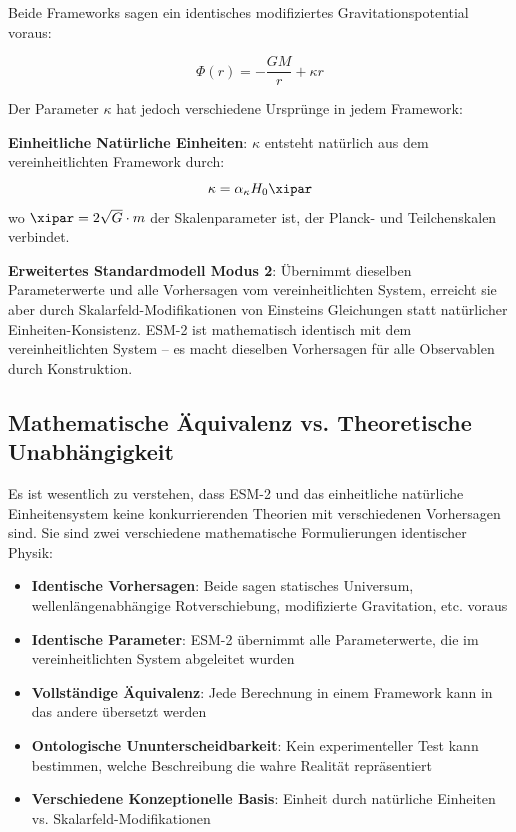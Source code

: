 	Beide Frameworks sagen ein identisches modifiziertes Gravitationspotential voraus:
	
	\begin{equation}
		\Phi(r) = -\frac{GM}{r} + \kappa r
	\end{equation}
	
	Der Parameter $\kappa$ hat jedoch verschiedene Ursprünge in jedem Framework:
	
	\textbf{Einheitliche Natürliche Einheiten}: $\kappa$ entsteht natürlich aus dem vereinheitlichten Framework durch:
	\begin{equation}
		\kappa = \alpha_\kappa H_0 \xipar
	\end{equation}
	wo $\xipar = 2\sqrt{G} \cdot m$ der Skalenparameter ist, der Planck- und Teilchenskalen verbindet.
	
	\textbf{Erweitertes Standardmodell Modus 2}: Übernimmt dieselben Parameterwerte und alle Vorhersagen vom vereinheitlichten System, erreicht sie aber durch Skalarfeld-Modifikationen von Einsteins Gleichungen statt natürlicher Einheiten-Konsistenz. ESM-2 ist mathematisch identisch mit dem vereinheitlichten System – es macht dieselben Vorhersagen für alle Observablen durch Konstruktion.
	
	\subsection{Mathematische Äquivalenz vs. Theoretische Unabhängigkeit}
	\label{subsec:equivalence_vs_independence}
	
	Es ist wesentlich zu verstehen, dass ESM-2 und das einheitliche natürliche Einheitensystem keine konkurrierenden Theorien mit verschiedenen Vorhersagen sind. Sie sind zwei verschiedene mathematische Formulierungen identischer Physik:
	
	\begin{itemize}
		\item \textbf{Identische Vorhersagen}: Beide sagen statisches Universum, wellenlängenabhängige Rotverschiebung, modifizierte Gravitation, etc. voraus
		\item \textbf{Identische Parameter}: ESM-2 übernimmt alle Parameterwerte, die im vereinheitlichten System abgeleitet wurden
		\item \textbf{Vollständige Äquivalenz}: Jede Berechnung in einem Framework kann in das andere übersetzt werden
		\item \textbf{Ontologische Ununterscheidbarkeit}: Kein experimenteller Test kann bestimmen, welche Beschreibung die wahre Realität repräsentiert
		\item \textbf{Verschiedene Konzeptionelle Basis}: Einheit durch natürliche Einheiten vs. Skalarfeld-Modifikationen
	\end{itemize}
	
